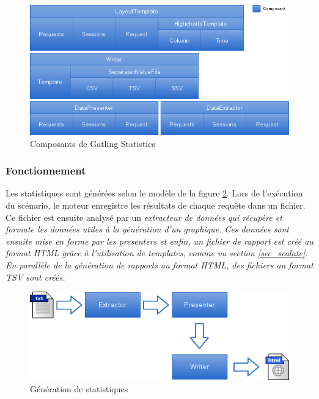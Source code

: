 \begin{figure}[h]
\begin{center}
\includegraphics[width=400pt]{img/gatling_stats.png}
\end{center}
\caption{Composants de Gatling Statistics}
\label{gatling_stats}
\end{figure}

\vfill
\subsubsection{Fonctionnement}
Les statistiques sont générées selon le modèle de la figure \ref{stats_gen}. Lors de l'exécution du scénario, le moteur enregistre les résultats de chaque requête dans un fichier. Ce fichier est ensuite analysé par un \em{extracteur de données} qui récupère et formate les données utiles à la génération d'un graphique. Ces données sont ensuite mise en forme par les \em{presenters} et enfin, un fichier de rapport est créé au format HTML grâce à l'utilisation de templates, comme vu section \ref{sec_scalate}. En parallèle de la génération de rapports au format HTML, des fichiers au format TSV sont créés.

\begin{figure}[h]
\begin{center}
\includegraphics{img/stats_gen.png}
\end{center}
\caption{Génération de statistiques}
\label{stats_gen}
\end{figure}

